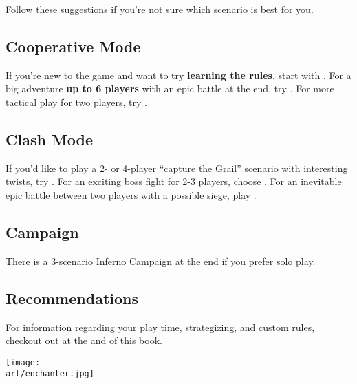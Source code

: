 
\begin{multicols}{2}

Follow these suggestions if you're not sure which scenario is best for you.

\subsection*{Cooperative Mode}

If you're new to the game and want to try \textbf{learning the rules}, start with .
For a big adventure \textbf{up to 6 players} with an epic battle at the end, try .
For more tactical play for two players, try .

\subsection*{Clash Mode}

If you'd like to play a 2- or 4-player ``capture the Grail'' scenario with interesting twists, try .
For an exciting boss fight for 2-3 players, choose .
For an inevitable epic battle between two players with a possible siege, play .

\subsection*{Campaign}

There is a 3-scenario Inferno  Campaign at the end if you prefer solo play.

\subsection*{Recommendations}

For information regarding your play time, strategizing, and custom rules, checkout out  at the and of this book.

\end{multicols}

\texttt{[image: \\art/enchanter.jpg]}

\vspace*{-1em}
